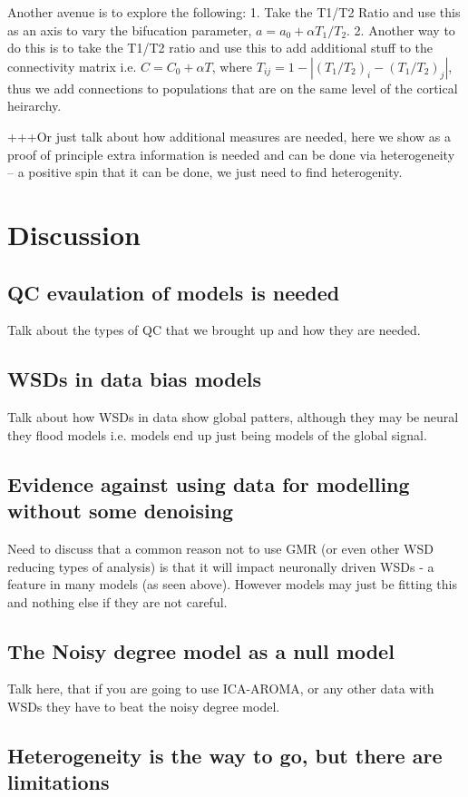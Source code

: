 \documentclass[oneside]{zHenriquesLab-StyleBioRxiv}
\begin{document}
Another avenue is to explore the following:
1. Take the T1/T2 Ratio and use this as an axis to vary the bifucation parameter, $a=a_0 + \alpha T_1/T_2$.
2. Another way to do this is to take the T1/T2 ratio and use this to add additional stuff to the connectivity matrix i.e. $C = C_0 + \alpha T$, where $T_{ij}  = 1 - |(T_1/T_2)_i - (T_1/T_2)_j|$, thus we add connections to populations that are on the same level of the cortical heirarchy. 

+++Or just talk about how additional measures are needed, here we show as a proof of principle extra information is needed and can be done via heterogeneity -- a positive spin that it can be done, we just need to find heterogenity. 


\section*{Discussion}
\subsection*{QC evaulation of models is needed}
Talk about the types of QC that we brought up and how they are needed. 

\subsection*{WSDs in data bias models} 
Talk about how WSDs in data show global patters, although they may be neural they flood models i.e. models end up just being models of the global signal.

\subsection*{Evidence against using data for modelling without some denoising} 
Need to discuss that a common reason not to use GMR (or even other WSD reducing types of analysis) is that it will impact neuronally driven WSDs - a feature in many models (as seen above). However models may just be fitting this and nothing else if they are not careful. 

\subsection*{The Noisy degree model as a null model}
Talk here, that if you are going to use ICA-AROMA, or any other data with WSDs they have to beat the noisy degree model. 

\subsection*{Heterogeneity is the way to go, but there are limitations}
\end{document}
